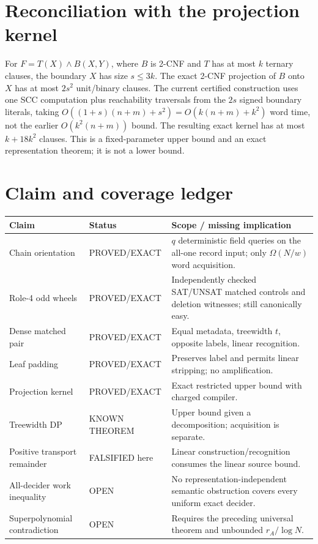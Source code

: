 \documentclass[11pt]{article}
\begin{document}
\section{Reconciliation with the projection kernel}
For $F=T(X)\wedge B(X,Y)$, where $B$ is 2-CNF and $T$ has at most $k$ ternary
clauses, the boundary $X$ has size $s\le3k$.  The exact 2-CNF projection of
$B$ onto $X$ has at most $2s^2$ unit/binary clauses.  The current certified
construction uses one SCC computation plus reachability traversals from the
$2s$ signed boundary literals, taking
$O((1+s)(n+m)+s^2)=O(k(n+m)+k^2)$ word time, not the earlier
$O(k^2(n+m))$ bound.  The resulting exact kernel has at most
$k+18k^2$ clauses.  This is a fixed-parameter upper bound and an exact
representation theorem; it is not a lower bound.

\section{Claim and coverage ledger}
\begin{center}\small
\begin{tabular}{p{.21\linewidth}p{.18\linewidth}p{.49\linewidth}}
\toprule
Claim & Status & Scope / missing implication\\\midrule
Chain orientation & PROVED/EXACT & $q$ deterministic field queries on the all-one record input; only $\Omega(N/w)$ word acquisition.\\
Role-4 odd wheels & PROVED/EXACT & Independently checked SAT/UNSAT matched controls and deletion witnesses; still canonically easy.\\
Dense matched pair & PROVED/EXACT & Equal metadata, treewidth $t$, opposite labels, linear recognition.\\
Leaf padding & PROVED/EXACT & Preserves label and permits linear stripping; no amplification.\\
Projection kernel & PROVED/EXACT & Exact restricted upper bound with charged compiler.\\
Treewidth DP & KNOWN THEOREM & Upper bound given a decomposition; acquisition is separate.\\
Positive transport remainder & FALSIFIED here & Linear construction/recognition consumes the linear source bound.\\
All-decider work inequality & OPEN & No representation-independent semantic obstruction covers every uniform exact decider.\\
Superpolynomial contradiction & OPEN & Requires the preceding universal theorem and unbounded $r_A/\log N$.\\
\bottomrule
\end{tabular}
\end{center}
\end{document}
